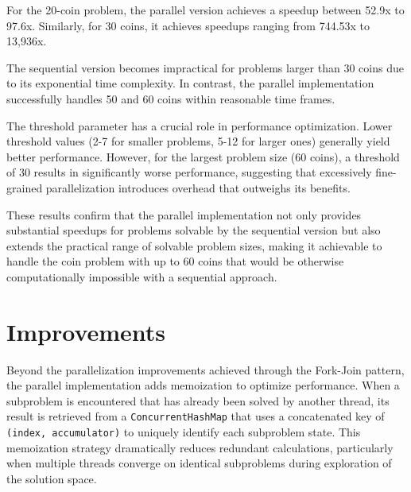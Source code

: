 For the 20-coin problem, the parallel version achieves a speedup between 52.9x to 97.6x. Similarly, for 30 coins, it achieves speedups ranging from 744.53x to 13,936x.

The sequential version becomes impractical for problems larger than 30 coins due to its exponential time complexity. In contrast, the parallel implementation successfully handles 50 and 60 coins within reasonable time frames.

The threshold parameter has a crucial role in performance optimization. Lower threshold values (2-7 for smaller problems, 5-12 for larger ones) generally yield better performance. However, for the largest problem size (60 coins), a threshold of 30 results in significantly worse performance, suggesting that excessively fine-grained parallelization introduces overhead that outweighs its benefits.

These results confirm that the parallel implementation not only provides substantial speedups for problems solvable by the sequential version but also extends the practical range of solvable problem sizes, making it achievable to handle the coin problem with up to 60 coins that would be otherwise computationally impossible with a sequential approach.

\section{Improvements}

Beyond the parallelization improvements achieved through the Fork-Join pattern, the parallel implementation adds memoization to optimize performance. When a subproblem is encountered that has already been solved by another thread, its result is retrieved from a \texttt{ConcurrentHashMap} that uses a concatenated key of \texttt{(index, accumulator)} to uniquely identify each subproblem state. This memoization strategy dramatically reduces redundant calculations, particularly when multiple threads converge on identical subproblems during exploration of the solution space.
